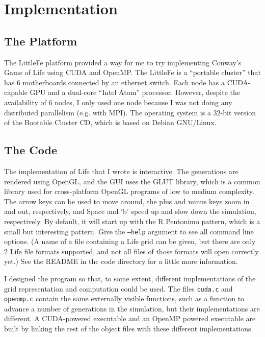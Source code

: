 \documentclass[letterpaper,12pt]{article}
\begin{document}
\section{Implementation}

\subsection{The Platform}

The LittleFe platform provided a way for me to try implementing Conway's Game of
Life using CUDA and OpenMP.  The LittleFe is a ``portable cluster'' that has 6
motherboards connected by an ethernet switch.  Each node has a CUDA-capable GPU
and a dual-core ``Intel Atom'' processor.  However, despite the availability of
6 nodes, I only used one node because I was not doing any distributed
parallelism (e.g. with MPI).  The operating system is a 32-bit version of the
Bootable Cluster CD, which is based on Debian GNU/Linux.

\subsection{The Code}

The implementation of Life that I wrote is interactive.  The generations are
rendered using OpenGL, and the GUI uses the GLUT library, which is a common
library used for cross-platform OpenGL programs of low to medium complexity. The
arrow keys can be used to move around, the plus and minus keys zoom in and out,
respectively, and Space and `b' speed up and slow down the simulation,
respectively. By default, it will start up with the R Pentonimo pattern, which
is a small but interesting pattern.  Give the {\tt --help} argument to see all
command line options.  (A name of a file containing a Life grid can be given,
but there are only 2 Life file formats supported, and not all files of those
formats will open correctly yet.)  See the README in the code directory for a
little more information.

I designed the program so that, to some extent, different implementations of the
grid representation and computation could be used.  The files {\tt cuda.c} and
{\tt openmp.c} contain the same externally visible functions, such as a
function to advance a number of generations in the simulation, but their
implementations are different.  A CUDA-powered executable and an OpenMP powered
executable are built by linking the rest of the object files with these
different implementations.
\end{document}
